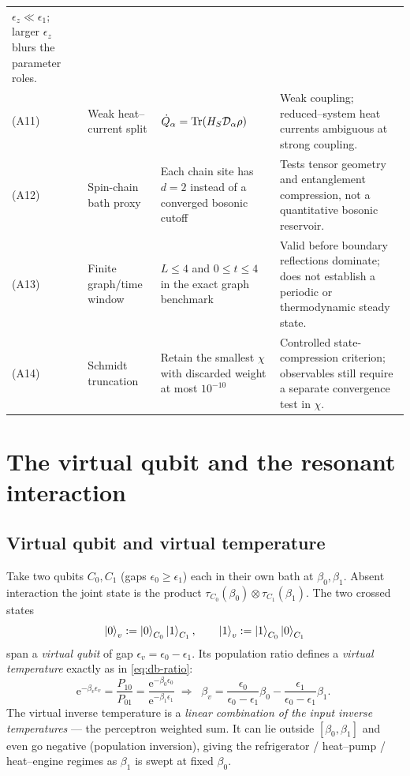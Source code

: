 \documentclass[11pt,a4paper]{article}
\theoremstyle{plain}
\theoremstyle{definition}
\theoremstyle{remark}
\newcommand{\ee}{\mathrm{e}}
\begin{document}
\begin{table}[t]
\begin{tabularx}{\textwidth}{@{}l l X X@{}}
$\epsilon_z\ll\epsilon_1$; larger $\epsilon_z$ blurs the parameter roles. \\
(A11) & Weak heat--current split &
$\dot Q_\alpha=\Tr(H_S\mathcal D_\alpha\rho)$ &
Weak coupling; reduced--system heat currents ambiguous at strong
coupling. \\
(A12) & Spin-chain bath proxy &
Each chain site has $d=2$ instead of a converged bosonic cutoff &
Tests tensor geometry and entanglement compression, not a quantitative
bosonic reservoir. \\
(A13) & Finite graph/time window &
$L\leq4$ and $0\leq t\leq4$ in the exact graph benchmark &
Valid before boundary reflections dominate; does not establish a
periodic or thermodynamic steady state. \\
(A14) & Schmidt truncation &
Retain the smallest $\chi$ with discarded weight at most $10^{-10}$ &
Controlled state-compression criterion; observables still require a
separate convergence test in $\chi$. \\
\bottomrule
\end{tabularx}
\end{table}

\section{The virtual qubit and the resonant interaction}
\label{sec:virtual}

\subsection{Virtual qubit and virtual temperature}
Take two qubits $C_0,C_1$ (gaps $\epsilon_0\ge\epsilon_1$) each in their
own bath at $\beta_0,\beta_1$. Absent interaction the joint state is the
product $\tau_{C_0}(\beta_0)\otimes\tau_{C_1}(\beta_1)$. The two crossed
states
\begin{equation}
\ket{0}_v:=\ket{0}_{C_0}\ket{1}_{C_1},\qquad
\ket{1}_v:=\ket{1}_{C_0}\ket{0}_{C_1}
\end{equation}
span a \emph{virtual qubit} of gap $\epsilon_v=\epsilon_0-\epsilon_1$.
Its population ratio defines a \emph{virtual temperature} exactly as in
\eqref{eq:db-ratio}:
\begin{equation}
\ee^{-\beta_v\epsilon_v}
=\frac{P_{10}}{P_{01}}
=\frac{\ee^{-\beta_0\epsilon_0}}{\ee^{-\beta_1\epsilon_1}}
\;\Rightarrow\;
\boxed{\;\beta_v=\frac{\epsilon_0}{\epsilon_0-\epsilon_1}\beta_0
-\frac{\epsilon_1}{\epsilon_0-\epsilon_1}\beta_1 .\;}
\label{eq:betav}
\end{equation}
The virtual inverse temperature is a \emph{linear combination of the
input inverse temperatures} --- the perceptron weighted sum. It can lie
outside $[\beta_0,\beta_1]$ and even go negative (population inversion),
giving the refrigerator / heat--pump / heat--engine regimes as $\beta_1$
is swept at fixed $\beta_0$.
\end{document}
